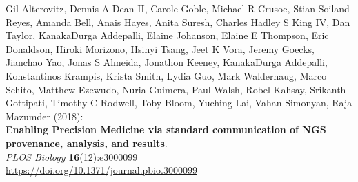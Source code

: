 \documentclass[10pt,letterpaper]{article}
\begin{document}
\nolinenumbers

%
%
% 
\begin{thebibliography}{10}

\setlength{\parskip}{6pt}
\setlength{\itemsep}{0pt plus 0.3ex}


\begin{small}







Gil Alterovitz, Dennis A Dean II, Carole Goble, Michael R Crusoe, Stian Soiland-Reyes, Amanda Bell, Anais Hayes, Anita Suresh, Charles Hadley S King IV, Dan Taylor, KanakaDurga Addepalli, Elaine Johanson, Elaine E Thompson, Eric Donaldson, Hiroki Morizono, Hsinyi Tsang, Jeet K Vora, Jeremy Goecks, Jianchao Yao, Jonas S Almeida, Jonathon Keeney, KanakaDurga Addepalli, Konstantinos Krampis, Krista Smith, Lydia Guo, Mark Walderhaug, Marco Schito, Matthew Ezewudo, Nuria Guimera, Paul Walsh, Robel Kahsay, Srikanth Gottipati, Timothy C Rodwell, Toby Bloom, Yuching Lai, Vahan Simonyan, Raja Mazumder (2018):\\
\textbf{Enabling Precision Medicine via standard communication of NGS provenance, analysis, and results}.\\
\emph{PLOS Biology} \textbf{16}(12):e3000099 \\
\url{https://doi.org/10.1371/journal.pbio.3000099}


\end{small}
\end{thebibliography}
\end{document}
